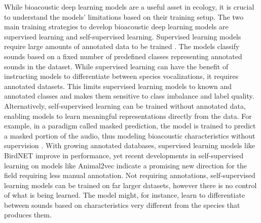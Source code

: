 While bioacoustic deep learning models are a useful asset in ecology, it is crucial to understand the models' limitations based on their training setup.
The two main training strategies to develop bioacoustic deep learning models are supervised learning and self-supervised learning.
Supervised learning models require large amounts of annotated data to be trained \cite{hagiwara_aves_2022}.
The models classify sounds based on a fixed number of predefined classes representing annotated sounds in the dataset.
While supervised learning can have the benefit of instructing models to differentiate between species vocalizations, it requires annotated datasets.
This limits supervised learning models to known and annotated classes and makes them sensitive to class imbalance and label quality.
Alternatively, self-supervised learning can be trained without annotated data, enabling models to learn meaningful representations directly from the data.
For example, in a paradigm called masked prediction, the model is trained to predict a masked portion of the audio, thus modeling bioacoustic characteristics without supervision \cite{huang_masked_2022}.
With growing annotated databases, supervised learning models like BirdNET \cite{kahl_birdnet_2021} improve in performance, yet recent developments in self-supervised learning on models like Animal2vec \cite{schafer-zimmermann_animal2vec_2024} indicate a promising new direction for the field requiring less manual annotation.
Not requiring annotations, self-supervised learning models can be trained on far larger datasets, however there is no control of what is being learned.
The model might, for instance, learn to differentiate between sounds based on characteristics very different from the species that produces them.


